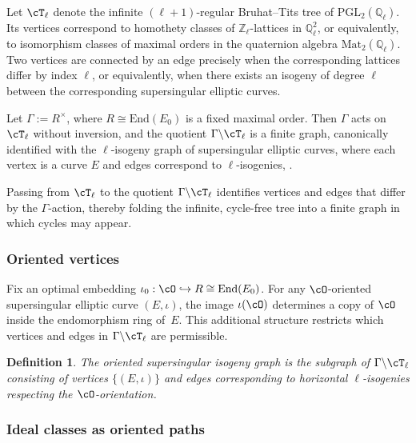\documentclass[10pt]{amsart}
\theoremstyle{theostyle}
\newtheorem{definition}[theorem]{Definition}
\newcommand{\QQ}{\mathbb{Q}} \newcommand{\RR}{\mathbb{R}}
\newcommand{\ZZ}{\mathbb{Z}}
\newcommand{\End}{\mathrm{End}}
\begin{document}
Let $\cT_\ell$ denote the infinite $(\ell+1)$-regular \cite{Serre:Trees} Bruhat--Tits tree of
$\mathrm{PGL}_2(\QQ_\ell)$.
Its vertices correspond to homothety classes of $\ZZ_\ell$-lattices in $\QQ_\ell^2$,
or equivalently, to isomorphism classes of maximal orders in the quaternion
algebra $\mathrm{Mat}_2\left(\QQ_\ell\right)$.  
Two vertices are connected by an edge precisely when the corresponding
lattices differ by index $\ell$, or equivalently, when there exists an isogeny
of degree $\ell$ between the corresponding supersingular elliptic curves.

Let $\Gamma := R^\times$, where $R\cong\End(E_0)$ is a fixed maximal order.
Then $\Gamma$ acts on $\cT_\ell$ without inversion, and the quotient $
\Gamma \backslash \cT_\ell$ 
is a finite graph, canonically identified with the $\ell$-isogeny
graph of supersingular elliptic curves, where each vertex is a curve $E$
and edges correspond to $\ell$-isogenies, \cite[\S 4.3]{Iezzi:BTTrees}.

Passing from $\cT_\ell$ to the quotient $\Gamma\backslash\cT_\ell$ identifies
vertices and edges that differ by the $\Gamma$-action, thereby folding the
infinite, cycle-free tree into a finite graph in which cycles may appear.
\subsubsection*{Oriented vertices}

Fix an optimal embedding $\iota_0:\cO\hookrightarrow R\cong\End(E_0)$.
For any $\cO$-oriented supersingular elliptic curve $(E,\iota)$, the image
$\iota(\cO)$ determines a copy of $\cO$ inside the endomorphism ring of~$E$.
This additional structure restricts which vertices and edges in
$\Gamma\backslash \cT_\ell$ are permissible.

\begin{definition}
	The \emph{oriented supersingular isogeny graph} is the subgraph of
	$\Gamma\backslash \cT_\ell$ consisting of vertices $\{(E,\iota)\}$ and edges
	corresponding to horizontal $\ell$-isogenies respecting the $\cO$-orientation.
\end{definition}

\subsubsection*{Ideal classes as oriented paths}
\end{document}
